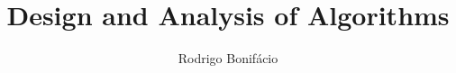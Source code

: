 \documentclass{beamer}
\title{Design and Analysis of Algorithms}
\author{Rodrigo Bonif\'{a}cio}
\begin{document}
\begin{frame}
\titlepage
\end{frame}






\end{document}
